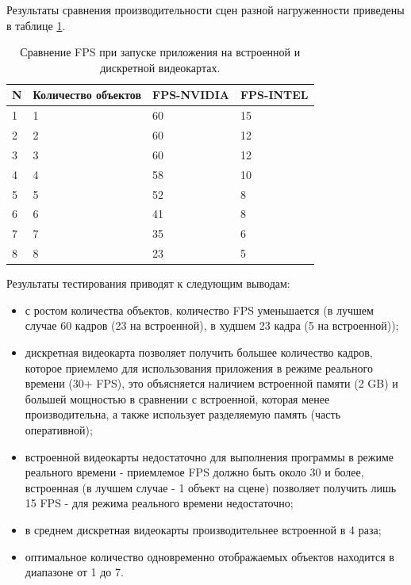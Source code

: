 Результаты сравнения производительности сцен разной нагруженности приведены в таблице \ref{tb:comp_fps}.
\begin{table}[]
  \caption{Сравнение FPS при запуске приложения на встроенной и дискретной видеокартах.}
  \begin{tabular}{|l|l|l|l|}
  \hline
  N & Количество объектов & FPS-NVIDIA & FPS-INTEL \\
  \hline
  1 & 1                   & 60         & 15        \\
  2 & 2                   & 60         & 12        \\
  3 & 3                   & 60         & 12        \\
  4 & 4                   & 58         & 10        \\
  5 & 5                   & 52         & 8         \\
  6 & 6                   & 41         & 8         \\
  7 & 7                   & 35         & 6         \\
  8 & 8                   & 23         & 5        \\
  \hline
  \end{tabular}
  \label{tb:comp_fps}
\end{table}

Результаты тестирования приводят к следующим выводам:
\begin{itemize}
  \item с ростом количества объектов, количество FPS уменьшается (в лучшем случае 60 кадров (23 на встроенной), в худшем 23 кадра (5 на встроенной));
  \item дискретная видеокарта позволяет получить большее количество кадров, которое приемлемо для использования приложения в режиме реального времени (30+ FPS),
  это объясняется наличием встроенной памяти (2 GB) и большей мощностью в сравнении с встроенной, которая менее производительна, а также использует разделяемую память (часть оперативной);
  \item встроенной видеокарты недостаточно для выполнения программы в режиме реального времени - приемлемое FPS должно быть около 30 и более, встроенная 
  (в лучшем случае - 1 объект на сцене) позволяет получить лишь 15 FPS -  для режима реального времени недостаточно;
  \item в среднем дискретная видеокарты производительнее встроенной в 4 раза;
  \item оптимальное количество одновременно отображаемых объектов находится в диапазоне от 1 до 7.
\end{itemize}


